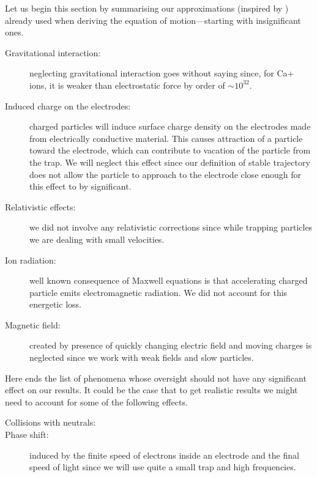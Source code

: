 Let us begin this section by summarising our approximations (inspired by \cite{Friedman_1982}) already used when deriving the equation of motion—starting with insignificant ones. 

\begin{description}
	\item[Gravitational interaction:] neglecting gravitational interaction goes without saying since, for Ca+ ions, it is weaker than electrostatic force by order of $\sim 10^{32}$.
	\item[Induced charge on the electrodes:] charged particles will induce surface charge density on the electrodes made from electrically conductive material. This causes attraction of a particle toward the electrode, which can contribute to vacation of the particle from the trap. We will neglect this effect since our definition of stable trajectory does not allow the particle to approach to the electrode close enough for this effect to by significant.
	\item[Relativistic effects:] we did not involve any relativistic corrections since while trapping particles we are dealing with small velocities.
	\item[Ion radiation:] well known consequence of Maxwell equations is that accelerating charged particle emits electromagnetic radiation. We did not account for this energetic loss.
	\item[Magnetic field:] created by presence of quickly changing electric field and moving charges is neglected since we work with weak fields and slow particles. 
\end{description}	
Here ends the list of phenomena whose oversight should not have any significant effect on our results. It could be the case that to get realistic results we might need to account for some of the following effects.
\begin{description}
	\item[Collisions with neutrals:]  
	\item[Phase shift:] induced by the finite speed of electrons inside an electrode and the final speed of light since we will use quite a small trap and high frequencies. 
\end{description}

